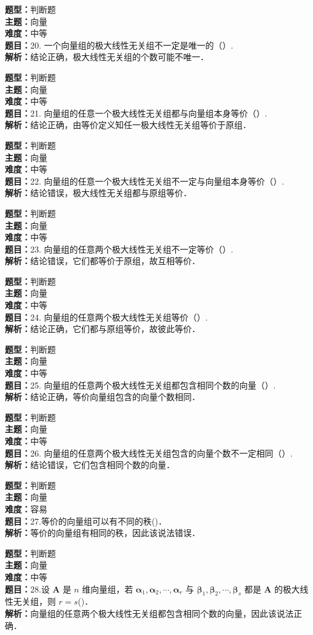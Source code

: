 \documentclass{ctexart}
\newenvironment{question}[5]{%
	\noindent\textbf{题型：}#1\\
	\textbf{主题：}#2\\
	\textbf{难度：}#3\\
	\textbf{题目：}#4\\
	\textbf{解析：}#5\\
	\vspace{1em}
}{}
\begin{document}
	\begin{question}
		{判断题}
		{向量}
		{中等}
		{20. 一个向量组的极大线性无关组不一定是唯一的（）. }
		{结论正确，极大线性无关组的个数可能不唯一．}
	\end{question}
	
	\begin{question}
		{判断题}
		{向量}
		{中等}
		{21. 向量组的任意一个极大线性无关组都与向量组本身等价（）. }
		{结论正确，由等价定义知任一极大线性无关组等价于原组．}
	\end{question}
	
	\begin{question}
		{判断题}
		{向量}
		{中等}
		{22. 向量组的任意一个极大线性无关组不一定与向量组本身等价（）. }
		{结论错误，极大线性无关组都与原组等价．}
	\end{question}
	
	\begin{question}
		{判断题}
		{向量}
		{中等}
		{23. 向量组的任意两个极大线性无关组不一定等价（）. }
		{结论错误，它们都等价于原组，故互相等价．}
	\end{question}
	
	\begin{question}
		{判断题}
		{向量}
		{中等}
		{24. 向量组的任意两个极大线性无关组等价（）. }
		{结论正确，它们都与原组等价，故彼此等价．}
	\end{question}
	
	\begin{question}
		{判断题}
		{向量}
		{中等}
		{25. 向量组的任意两个极大线性无关组都包含相同个数的向量（）. }
		{结论正确，等价向量组包含的向量个数相同．}
	\end{question}
	
	\begin{question}
		{判断题}
		{向量}
		{中等}
		{26. 向量组的任意两个极大线性无关组包含的向量个数不一定相同（）. }
		{结论错误，它们包含相同个数的向量．}
	\end{question}
	
	
	\begin{question}
		{判断题}
		{向量}
		{容易}
		{27.等价的向量组可以有不同的秩(\qquad)．}
		{等价的向量组有相同的秩，因此该说法错误．}
	\end{question}
	
	\begin{question}
		{判断题}
		{向量}
		{中等}
		{28.设 \(\mathbf{A}\) 是 \(n\) 维向量组，若 \(\boldsymbol{\alpha}_1, \boldsymbol{\alpha}_2, \cdots, \boldsymbol{\alpha}_r\) 与 \(\boldsymbol{\beta}_1, \boldsymbol{\beta}_2, \cdots, \boldsymbol{\beta}_s\) 都是 \(\mathbf{A}\) 的极大线性无关组，则 \(r = s\)(\qquad)．}
		{向量组的任意两个极大线性无关组都包含相同个数的向量，因此该说法正确．}
	\end{question}
	
\end{document}
